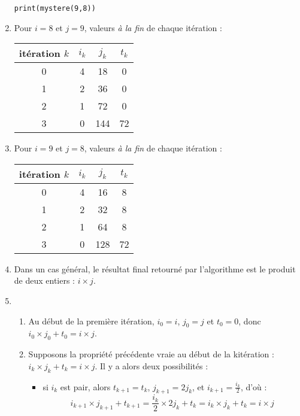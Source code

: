 \begin{enumerate}
\begin{verbatim}
print(mystere(9,8))
\end{verbatim}

\item Pour $i=8$ et $j=9$, valeurs \textit{à la fin} de chaque itération :
\begin{center}
\begin{tabular}{|c|c|c|c|}\hline
itération $k$ & $i_k$ & $j_k$ & $t_k$ \\\hline
0 & 4 & 18  & 0\\\hline
1 & 2 & 36  & 0\\\hline
2 & 1 & 72  & 0\\\hline
3 & 0 & 144 & 72\\\hline
\end{tabular}
\end{center}

\item Pour $i=9$ et $j=8$, valeurs \textit{à la fin} de chaque itération :
\begin{center}
\begin{tabular}{|c|c|c|c|}\hline
itération $k$ & $i_k$ & $j_k$ & $t_k$ \\\hline
0 & 4 & 16  & 8\\\hline
1 & 2 & 32  & 8\\\hline
2 & 1 & 64  & 8\\\hline
3 & 0 & 128 & 72\\\hline
\end{tabular}
\end{center}

\newpage 

\item Dans un cas général, le résultat final retourné par l'algorithme est le produit de deux entiers : $i \times j$.
\item 
\begin{enumerate}
\item Au début de la première itération, $i_0=i$, $j_0=j$ et $t_0=0$, donc $i_0 \times j_0 + t_0 = i \times j$.

\item Supposons la propriété précédente vraie au début de la k\ieme itération : $i_k \times j_k + t_k = i \times j$. Il y a alors deux possibilités :

\begin{itemize}                                                                                                                                                      \item si $i_k$ est pair, alors $t_{k+1}=t_k$, $j_{k+1}=2 j_k$, et $i_{k+1}=\frac{i_k}{2}$, d'où : $$i_{k+1} \times j_{k+1} + t_{k+1} = \frac{i_k}{2} \times 2j_k + t_k = i_k \times j_k + t_k = i \times j$$ 


\end{itemize}
\end{enumerate}
\end{enumerate}
